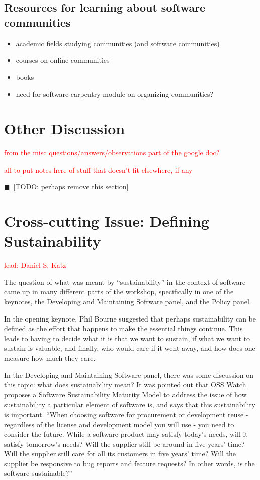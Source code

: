\documentclass[11pt, oneside]{amsart}
\newcommand{\todo}[1]{{\color{blue}$\blacksquare$~\textsf{[TODO: #1]}}}
\newcommand{\note}[1]{ {\textcolor{red}    { #1 }}}
\begin{document}
\subsection{Resources for learning about software communities}
\begin{itemize}
\item academic fields studying communities (and software communities)
\item courses on online communities
\item books
\item need for software carpentry module on organizing communities?
\end{itemize}

\section{Other Discussion} \label{sec:other}

\note{from the misc questions/answers/observations part of the google doc?}

\note{all to put notes here of stuff that doesn't fit elsewhere, if any}

\todo{perhaps remove this section}


\section{Cross-cutting Issue: Defining Sustainability}  \label{sec:cross-cutting}

\note{lead: Daniel S. Katz}

The question of what was meant by ``sustainability'' in the context of software
came up in many different parts of the workshop, specifically in one of the
keynotes, the Developing and Maintaining Software panel, and the Policy panel.

In the opening keynote, Phil Bourne suggested that perhaps sustainability can be defined
as the effort that happens to make the essential things continue. This leads to
having to decide what it is that we want to sustain, if what we want to sustain is
valuable, and finally, who would care if it went away, and how does one measure
how much they care.

In the Developing and Maintaining Software panel, there was some discussion
on this topic: what does sustainability mean? It was pointed out that
OSS Watch proposes a Software Sustainability Maturity Model to address
the issue of how sustainability a particular element of software is, and says
that this sustainability is important. ``When choosing
software for procurement or development reuse - regardless of the
license and development model you will use - you need to consider
the future. While a software product may satisfy today's needs, will
it satisfy tomorrow's needs? Will the supplier still be around in
five years' time? Will the supplier still care for all its customers
in five years' time? Will the supplier be responsive to bug reports
and feature requests? In other words, is the software sustainable?''~\cite{OSS-ssmm-web}
\end{document}
